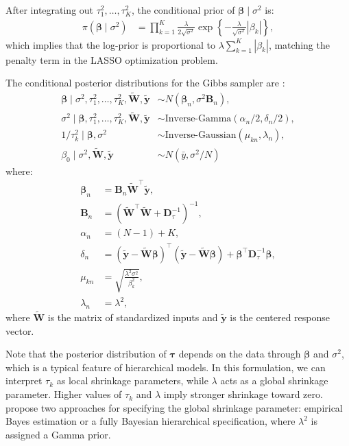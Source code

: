 After integrating out \( \tau_1^2, \dots, \tau_K^2 \), the conditional prior of \( \boldsymbol{\beta} \mid \sigma^2 \) is:
\begin{align*}
	\pi(\boldsymbol{\beta} \mid \sigma^2) &= \prod_{k=1}^K \frac{\lambda}{2 \sqrt{\sigma^2}} \exp\left\{ -\frac{\lambda}{\sqrt{\sigma^2}} |\beta_k| \right\},
\end{align*}
which implies that the log-prior is proportional to \( \lambda \sum_{k=1}^K |\beta_k| \), matching the penalty term in the LASSO optimization problem.

The conditional posterior distributions for the Gibbs sampler are \cite{Park2008}:
\begin{align*}
	\boldsymbol{\beta} \mid \sigma^2, \tau_1^2, \dots, \tau_K^2, \tilde{\mathbf{W}}, \tilde{\mathbf{y}} &\sim {N}(\boldsymbol{\beta}_n, \sigma^2 \mathbf{B}_n), \\
	\sigma^2 \mid \boldsymbol{\beta}, \tau_1^2, \dots, \tau_K^2, \tilde{\mathbf{W}}, \tilde{\mathbf{y}} &\sim \text{Inverse-Gamma}(\alpha_n/2, \delta_n/2), \\
	1/\tau_k^2 \mid \boldsymbol{\beta}, \sigma^2 &\sim \text{Inverse-Gaussian}(\mu_{kn}, \lambda_n),\\
	\beta_0\mid \sigma^2, \tilde{\mathbf{W}}, \tilde{\mathbf{y}} &\sim N(\bar{y},\sigma^2/N) 
\end{align*}
where:
\begin{align*}
	\boldsymbol{\beta}_n &= \mathbf{B}_n \tilde{\mathbf{W}}^{\top} \tilde{\mathbf{y}}, \\
	\mathbf{B}_n &= \left( \tilde{\mathbf{W}}^{\top} \tilde{\mathbf{W}} + \mathbf{D}_{\tau}^{-1} \right)^{-1}, \\
	\alpha_n &= (N - 1) + K, \\
	\delta_n &= (\tilde{\mathbf{y}} - \tilde{\mathbf{W}} \boldsymbol{\beta})^{\top} (\tilde{\mathbf{y}} - \tilde{\mathbf{W}} \boldsymbol{\beta}) + \boldsymbol{\beta}^{\top} \mathbf{D}_{\tau}^{-1} \boldsymbol{\beta}, \\
	\mu_{kn} &= \sqrt{ \frac{ \lambda^2 \sigma^2 }{ \beta_k^2 } }, \\
	\lambda_n &= \lambda^2,
\end{align*}
where $\tilde{\mathbf{W}}$ is the matrix of standardized inputs and $\tilde{\mathbf{y}}$ is the centered response vector.

Note that the posterior distribution of $\boldsymbol{\tau}$ depends on the data through $\boldsymbol{\beta}$ and $\sigma^2$, which is a typical feature of hierarchical models. In this formulation, we can interpret \( \tau_k \) as local shrinkage parameters, while \( \lambda \) acts as a global shrinkage parameter. Higher values of \( \tau_k \) and \( \lambda \) imply stronger shrinkage toward zero. \cite{Park2008} propose two approaches for specifying the global shrinkage parameter: empirical Bayes estimation or a fully Bayesian hierarchical specification, where \( \lambda^2 \) is assigned a Gamma prior.

